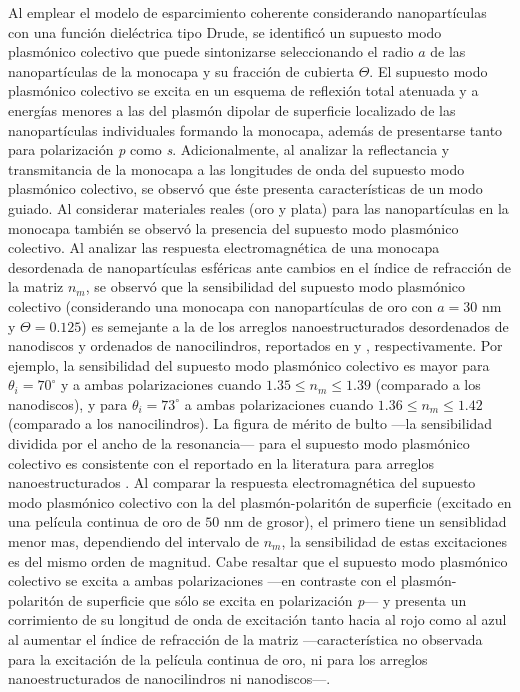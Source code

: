Al emplear el modelo de esparcimiento coherente considerando nanopartículas con una función dieléctrica tipo Drude, se identificó un supuesto modo plasmónico colectivo que puede sintonizarse seleccionando el radio $a$ de las nanopartículas de la monocapa y su fracción de cubierta $\Theta$. El supuesto modo plasmónico colectivo se excita en un esquema de reflexión total atenuada y a energías menores a las del plasmón dipolar de superficie localizado de las nanopartículas individuales formando la monocapa, además de presentarse tanto para polarización \emph{p} como \emph{s}. Adicionalmente,  al analizar la reflectancia y transmitancia de la monocapa a las longitudes de onda del supuesto modo plasmónico colectivo, se observó que éste presenta características de un modo guiado. Al considerar materiales reales (oro y plata) para las nanopartículas en la monocapa también se observó la presencia del supuesto modo plasmónico colectivo. Al analizar las respuesta electromagnética de una  monocapa desordenada de nanopartículas esféricas ante cambios en el índice de refracción de la matriz $n_m$, se observó que la sensibilidad del supuesto  modo plasmónico colectivo (considerando una monocapa con nanopartículas de oro con  $a=30$ nm y $\Theta=0.125$) es semejante a la de los arreglos nanoestructurados desordenados de nanodiscos y ordenados de nanocilindros, reportados en \cite{svedendahl2009refractometric} y \cite{danilov2018ultra}, respectivamente. Por ejemplo, la sensibilidad del supuesto modo plasmónico colectivo es mayor para $\theta_i = 70^\circ$ y a ambas polarizaciones cuando $1.35 \leq n_m \leq 1.39$ (comparado a los nanodiscos), y para $\theta_i=73^\circ$ a ambas polarizaciones cuando $1.36\leq n_m \leq 1.42$ (comparado a los nanocilindros). La figura de mérito de bulto ---la sensibilidad dividida por el ancho de la resonancia--- para el supuesto modo plasmónico colectivo es consistente con el reportado en la literatura para arreglos nanoestructurados \cite{svedendahl2009refractometric}. Al comparar la respuesta electromagnética del supuesto modo plasmónico colectivo con la del plasmón-polaritón de superficie (excitado en una película continua de oro de $50$ nm de grosor), el primero tiene un sensiblidad menor mas, dependiendo del intervalo de $n_m$, la sensibilidad de estas excitaciones es del mismo orden de magnitud. Cabe resaltar que el supuesto modo plasmónico colectivo se excita a ambas polarizaciones ---en contraste con el plasmón-polaritón de superficie que sólo se excita en polarización \emph{p}--- y presenta un corrimiento de su longitud de onda de excitación tanto hacia al rojo como al azul al aumentar el índice de refracción de la matriz ---característica no observada para la excitación de la película continua de oro, ni para los arreglos nanoestructurados de nanocilindros ni nanodiscos---.

